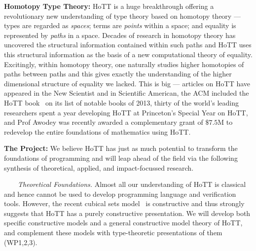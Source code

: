 \documentclass[a4paper,11pt]{article}
\begin{document}
{\bf Homotopy Type Theory:} HoTT is a huge
breakthrough offering a revolutionary new understanding of type theory
based on homotopy theory --- types are regarded as
\emph{spaces}; terms are \emph{points} within a space; and equality is
represented by \emph{paths} in a space. Decades of research in
homotopy theory has uncovered the structural information contained
within such paths and HoTT uses this structural information as the
basis of a new computational theory of equality. Excitingly, within
homotopy theory, one naturally studies higher homotopies of paths
between paths and this gives exactly the understanding of the higher
dimensional structure of equality we lacked. This is big --- articles
on HoTT have appeared in the New Scientist
and in Scientific American, the ACM included the HoTT
book~\cite{hott-book} on its list of notable books of 2013, thirty of 
the world's leading researchers spent a year developing HoTT at
Princeton's Special Year on HoTT, and Prof Awodey was
recently awarded a
complementary grant of $\$ 7.5$M to redevelop the entire
foundations of mathematics using HoTT.


{\bf The Project:} We believe HoTT has just as much potential to
transform the foundations of programming and will leap
ahead of the field via the following
synthesis of theoretical, applied, and impact-focussed research.

$\;\;\; \;\;\;$ {\em Theoretical Foundations.} 
Almost all our understanding of HoTT is classical and hence
cannot be used to develop programming language and verification
tools. However, the recent cubical sets model~\cite{BezemM:cubsmt,nominal} is constructive and
thus strongly suggests that HoTT has a purely constructive
presentation. We will develop both specific constructive models and a
general constructive model theory of HoTT, and complement these models
with type-theoretic presentations of them (WP1,2,3).
\end{document}
